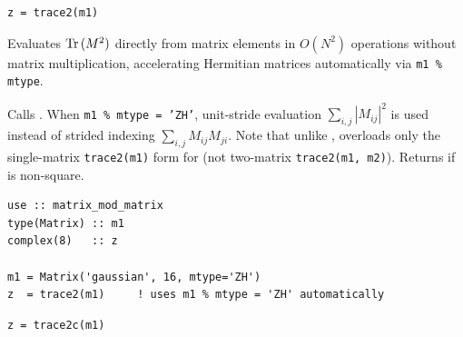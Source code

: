 
\lstset{language=[95]Fortran}
\begin{lstlisting}
z = trace2(m1)
\end{lstlisting}

Evaluates ${\rm Tr\,}(M^2)$ directly from matrix elements in $O(N^2)$ operations without matrix multiplication, accelerating Hermitian matrices automatically via \texttt{m1 \% mtype}.

Calls . When \texttt{m1 \% mtype = 'ZH'}, unit-stride evaluation $\sum_{i,j} |M_{ij}|^2$ is used instead of strided indexing $\sum_{i,j} M_{ij} M_{ji}$. Note that unlike ,  overloads only the single-matrix \texttt{trace2(m1)} form for  (not two-matrix \texttt{trace2(m1, m2)}). Returns  if  is non-square.

\begin{description}[leftmargin=2.2cm, style=nextline]
\end{description}

\lstset{language=[95]Fortran}
\begin{lstlisting}
use :: matrix_mod_matrix
type(Matrix) :: m1
complex(8)   :: z

m1 = Matrix('gaussian', 16, mtype='ZH')
z  = trace2(m1)     ! uses m1 % mtype = 'ZH' automatically
\end{lstlisting}


\lstset{language=[95]Fortran}
\begin{lstlisting}
z = trace2c(m1)
\end{lstlisting}

